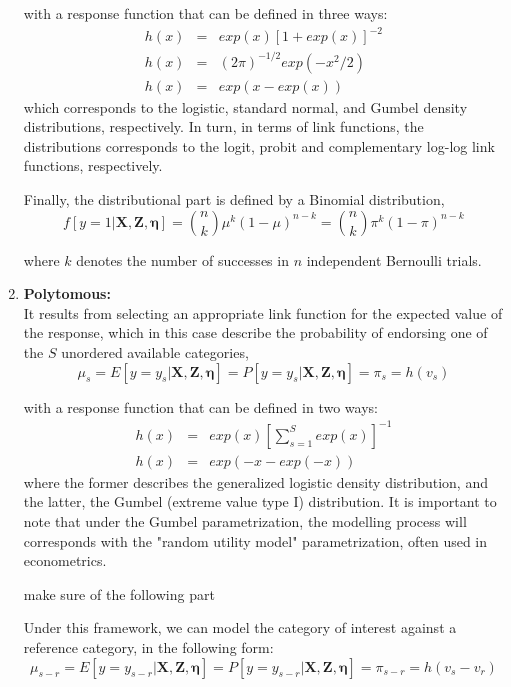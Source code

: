 \begin{enumerate}
	with a response function that can be defined in three ways:	
	\begin{eqnarray}
		h(x) &= &exp(x)[1 + exp(x)]^{-2} \label{eq:response_dich1}\\
		h(x) &= &(2 \pi )^{-1/2} exp(-x^{2}/2) \\
		h(x) &= &exp(x - exp(x))
	\end{eqnarray}
	which corresponds to the logistic, standard normal, and {\color{red} Gumbel} density distributions, respectively. In turn, in terms of link functions, the distributions corresponds to the logit, probit and complementary log-log link functions, respectively. 
	
	Finally, the distributional part is defined by a Binomial distribution,
	\begin{equation} \label{eq:dist_dich}
		f[y=1 | \mathbf{X}, \mathbf{Z}, \pmb{\eta}] = \binom{n}{k} \mu^{k} (1-\mu)^{n-k}= \binom{n}{k} \pi^{k} (1-\pi)^{n-k}
	\end{equation}

	where $k$ denotes the number of successes in $n$ independent Bernoulli trials.
	
			
	\item \textbf{Polytomous:} \\	
	It results from selecting an appropriate link function for the expected value of the response, which in this case describe the probability of endorsing one of the $S$ unordered available categories,
	\begin{equation} \label{eq:link_poly1}
		\mu_{s} = E[y=y_{s} | \mathbf{X}, \mathbf{Z}, \pmb{\eta}] = P[y=y_{s} | \mathbf{X}, \mathbf{Z}, \pmb{\eta}] = \pi_{s} = h(v_{s})
	\end{equation}
	
	with a response function that can be defined in two ways: 
	\begin{eqnarray}
		h(x) &= &exp(x)\left[\sum_{s=1}^{S} exp(x)\right]^{-1}\\
		h(x) &= &exp(-x-exp(-x))
	\end{eqnarray}
	where the former describes the generalized logistic density distribution, and the latter, the Gumbel (extreme value type I) distribution. It is important to note that under the Gumbel parametrization, the modelling process will corresponds with the "random utility model" parametrization, often used in econometrics. 
	
	{\color{red} make sure of the following part}
	
	Under this framework, we can model the category of interest against a reference category, in the following form:
	\begin{equation} \label{eq:link_poly2}
		\mu_{s-r} = E[y=y_{s-r} | \mathbf{X}, \mathbf{Z}, \pmb{\eta}] = P[y=y_{s-r} | \mathbf{X}, \mathbf{Z}, \pmb{\eta}] = \pi_{s-r} = h(v_{s} - v_{r})
	\end{equation}


\end{enumerate}

